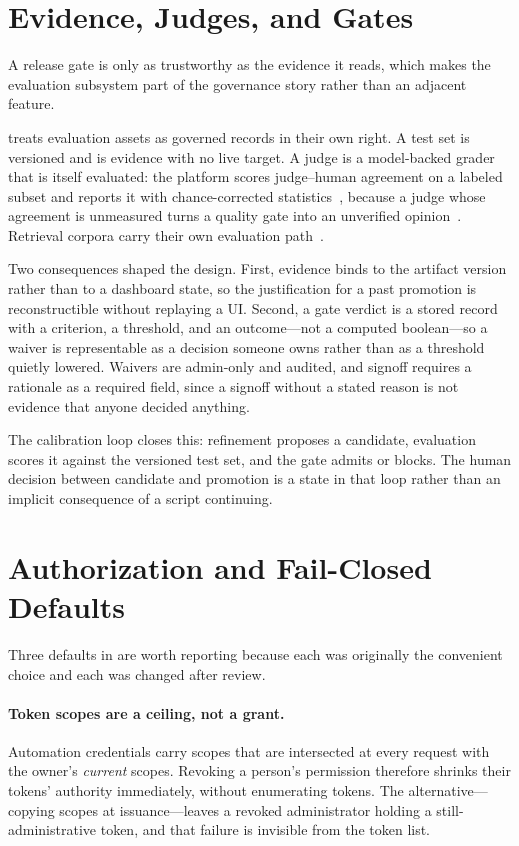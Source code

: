 \documentclass{article}
\begin{document}
\section{Evidence, Judges, and Gates}

A release gate is only as trustworthy as the evidence it reads, which makes the
evaluation subsystem part of the governance story rather than an adjacent feature.

\sys treats evaluation assets as governed records in their own right. A test set is
versioned and is evidence with no live target. A judge is a model-backed grader that
is itself evaluated: the platform scores judge--human agreement on a labeled subset
and reports it with chance-corrected statistics~\cite{cohen1960kappa,fleiss1971kappa},
because a judge whose agreement is unmeasured turns a quality gate into an unverified
opinion~\cite{zheng2023judging,liu2023geval}. Retrieval corpora carry their own
evaluation path~\cite{es2024ragas}.

Two consequences shaped the design. First, evidence binds to the artifact version
rather than to a dashboard state, so the justification for a past promotion is
reconstructible without replaying a UI. Second, a gate verdict is a stored record
with a criterion, a threshold, and an outcome---not a computed boolean---so a waiver
is representable as a decision someone owns rather than as a threshold quietly
lowered. Waivers are admin-only and audited, and signoff requires a rationale as a
required field, since a signoff without a stated reason is not evidence that anyone
decided anything.

The calibration loop closes this: refinement proposes a candidate, evaluation scores
it against the versioned test set, and the gate admits or blocks. The human decision
between candidate and promotion is a state in that loop rather than an implicit
consequence of a script continuing.

\section{Authorization and Fail-Closed Defaults}

Three defaults in \sys are worth reporting because each was originally the
convenient choice and each was changed after review.

\paragraph{Token scopes are a ceiling, not a grant.} Automation credentials carry
scopes that are intersected at every request with the owner's \emph{current} scopes.
Revoking a person's permission therefore shrinks their tokens' authority
immediately, without enumerating tokens. The alternative---copying scopes at
issuance---leaves a revoked administrator holding a still-administrative token, and
that failure is invisible from the token list.
\end{document}
